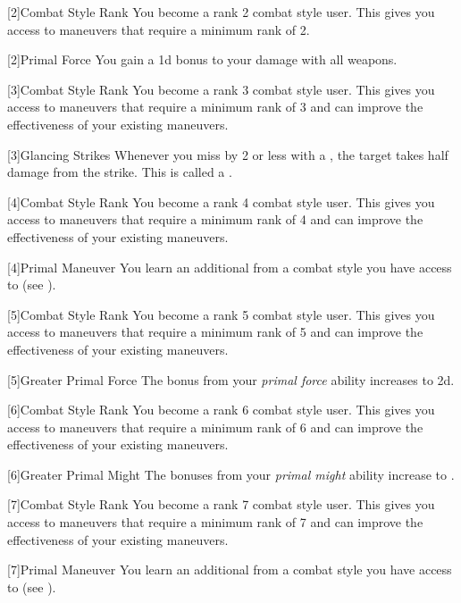         {
            [2]{Combat Style Rank} You become a rank 2 combat style user.
            This gives you access to maneuvers that require a minimum rank of 2.

            [2]{Primal Force} You gain a \plus1d bonus to your damage with all weapons.
        }

        {
            [3]{Combat Style Rank} You become a rank 3 combat style user.
            This gives you access to maneuvers that require a minimum rank of 3 and can improve the effectiveness of your existing maneuvers.

            [3]{Glancing Strikes} Whenever you miss by 2 or less with a , the target takes half damage from the strike.
            This is called a .
        }

        {
            [4]{Combat Style Rank} You become a rank 4 combat style user.
            This gives you access to maneuvers that require a minimum rank of 4 and can improve the effectiveness of your existing maneuvers.

            [4]{Primal Maneuver}
            You learn an additional  from a combat style you have access to (see ).
        }

        {
            [5]{Combat Style Rank} You become a rank 5 combat style user.
            This gives you access to maneuvers that require a minimum rank of 5 and can improve the effectiveness of your existing maneuvers.

            [5]{Greater Primal Force} The bonus from your \textit{primal force} ability increases to \plus2d.
        }

        {
            [6]{Combat Style Rank} You become a rank 6 combat style user.
            This gives you access to maneuvers that require a minimum rank of 6 and can improve the effectiveness of your existing maneuvers.

            [6]{Greater Primal Might} The bonuses from your \textit{primal might} ability increase to .
        }

        {
            [7]{Combat Style Rank} You become a rank 7 combat style user.
            This gives you access to maneuvers that require a minimum rank of 7 and can improve the effectiveness of your existing maneuvers.

            [7]{Primal Maneuver}
            You learn an additional  from a combat style you have access to (see ).

        }

